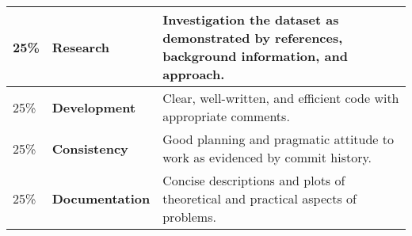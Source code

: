 \documentclass[12pt, a4paper, hidelinks]{scrartcl}
\begin{document}
  \begin{center}
    \begin{tabular}{llp{8.4cm}}
      \toprule
      25\% & \textbf{Research} & Investigation the dataset as demonstrated by references, background information, and approach. \\
      \midrule
      25\% & \textbf{Development} & Clear, well-written, and efficient code with appropriate comments. \\
      \midrule
      25\% & \textbf{Consistency} & Good planning and pragmatic attitude to work as evidenced by commit history. \\
      \midrule
      25\% & \textbf{Documentation} & Concise descriptions and plots of theoretical and practical aspects of problems. \\
      \bottomrule
    \end{tabular}
  \end{center}
\end{document}
